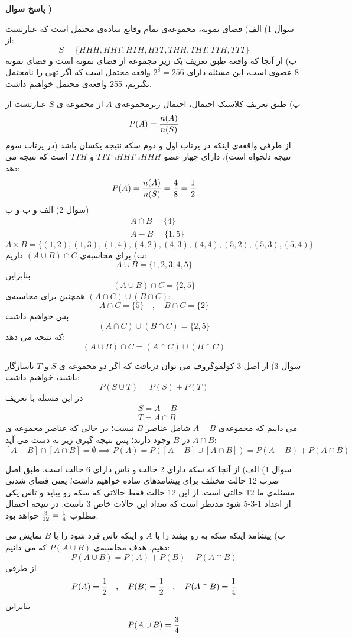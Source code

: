 \documentclass[10pt,letterpaper]{report}
\newcounter{questionanswernumber}
\newcommand{\QA}{
\textbf{پاسخ سوال \thequestionanswernumber)}
\stepcounter{questionanswernumber}
}
\begin{document}
\QA


سوال 1) الف) فضای نمونه، مجموعه‌ی تمام وقایع ساده‌ی محتمل است که عبارتست از:
$$
S=\{HHH,HHT,HTH,HTT,THH,THT,TTH,TTT\}
$$
ب) از آنجا که واقعه طبق تعریف یک زیر مجموعه از فضای نمونه است و فضای نمونه 8 عضوی است، این مسئله دارای $2^8=256$ واقعه محتمل است که اگر تهی را نامحتمل بگیریم، 255 وافعه‌ی محتمل خواهیم داشت.

پ) طبق تعریف کلاسیک احتمال، احتمال زیرمجموعه‌ی $A$ از مجموعه ی $S$ عبارتست از
$$
P(A)={n(A)\over n(S)}
$$
از طرفی واقعه‌ی اینکه در پرتاب اول و دوم سکه نتیجه یکسان باشد (در پرتاب سوم نتیجه دلخواه است)، دارای چهار عضو $HHH$، $HHT$، $TTT$ و $TTH$ است که نتیجه می دهد:
$$
P(A)={n(A)\over n(S)}={4\over8}={1\over2}
$$
سوال 2) الف و ب و پ)
\[
\begin{split}
&A\cap B=\{4\}
\\&A-B=\{1,5\}
\end{split}
\]
$$
A\times B=\{(1,2),(1,3),(1,4),(4,2),(4,3),(4,4),(5,2),(5,3),(5,4)\}
$$
ت) برای محاسبه‌ی 
$
(A\cup B)\cap C
$
داریم:
$$
A\cup B=\{1,2,3,4,5\}
$$
بنابراین
$$
(A\cup B)\cap C=\{2,5\}
$$
همچنین برای محاسبه‌ی $(A\cap C)\cup (B\cap C)$:
$$
A\cap C=\{5\}\quad,\quad B\cap C=\{2\}
$$
پس خواهیم داشت
$$
(A\cap C)\cup(B\cap C)=\{2,5\}
$$
که نتیجه می دهد:
$$
(A\cup B)\cap C=(A\cap C)\cup (B\cap C)
$$

سوال 3) از اصل 3 کولموگروف می توان دریافت که اگر دو مجموعه ی $S$ و $T$ ناسازگار باشند، خواهیم داشت:
$$
P(S\cup T)=P(S)+P(T)
$$
در این مسئله با تعریف
\[
\begin{split}
&S=A-B
\\&T=A\cap B
\end{split}
\]
می دانیم که مجموعه‌ی $A-B$ شامل عناصر $B$ نیست؛ در حالی که عناصر مجموعه ی $A\cap B$ در $B$ وجود دارند؛ پس نتیجه گیری زیر به دست می آید:
$$
[A-B]\cap[A\cap B]=\emptyset\implies P(A)=P([A-B]\cup[A\cap B])=P(A-B)+P(A\cap B)
$$



سوال 1) الف) از آنجا که سکه دارای 2 حالت و تاس دارای 6 حالت است، طبق اصل ضرب 12 حالت مختلف برای پیشامدهای ساده خواهیم داشت؛ یعنی فضای شدنی مسئله‌ی ما 12 حالتی است. از این 12 حالت فقط حالاتی که سکه رو بیاید و تاس یکی از اعداد 1-3-5 شود مدنظر است که تعداد این حالات خاص 3 تاست. در نتیجه احتمال مطلوب 
$
{3\over 12}={1\over 4}
$
خواهد بود.

ب) پیشامد اینکه سکه به رو بیفتد را با $A$ و اینکه تاس فرد شود را با $B$ نمایش می دهیم. هدف محاسبه‌ی 
$
P(A\cup B)
$
 که می دانیم:
$$
P(A\cup B)=P(A)+P(B)-P(A\cap B)
$$
از طرفی
$$
P(A)={1\over 2}\quad,\quad P(B)={1\over 2}\quad,\quad P(A\cap B)={1\over 4}
$$
بنابراین
$$
P(A\cup B)={3\over 4}
$$
\end{document}
